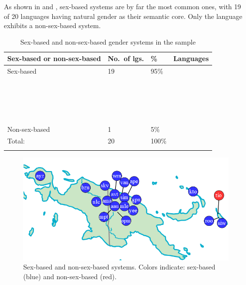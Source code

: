 \documentclass[output=collectionpaper]{langsci/langscibook}
\begin{document}
As shown in  and , sex-based systems are by far the most common ones, with 19 of 20 languages having natural gender as their semantic core. Only the  language  exhibits a non-sex-based system.

\begin{table}[p]
\small
\begin{tabularx}{\textwidth}{lYYl}
\lsptoprule
\bfseries Sex-based or non-sex-based & \bfseries No.\ of lgs. & \bfseries \% & \bfseries Languages\\
\midrule
Sex-based & 19 & 95\% & {}\\
&&& {}      \\
&&& {}       \\
&&& {}  \\
&&& {}  \\
&&& {}     \\
&&& {}  \\
&&& {}  \\
&&& {}    \\
&&& {}     \\
&&& {}   \\
&&& {}    \\
&&& {} \\
&&& {}  \\
&&& {}     \\
&&& {}    \\
&&& {}   \\
&&& {}\\
&&& \\
\tablevspace
Non-sex-based & 1 & 5\% & \\
\midrule
Total: & 20 & 100\% & \\
\lspbottomrule
\end{tabularx}
\caption{Sex-based and non-sex-based gender systems in the sample}
\label{tab:Svard:2}
\end{table}

\begin{figure}[p]
\includegraphics[width=.8\textwidth]{figures/09/Simple/fig2.png}
\caption{Sex-based and non-sex-based systems. Colors indicate: sex-based (blue) and non-sex-based (red).}
\label{fig:Svard:2}
\end{figure}
\end{document}
